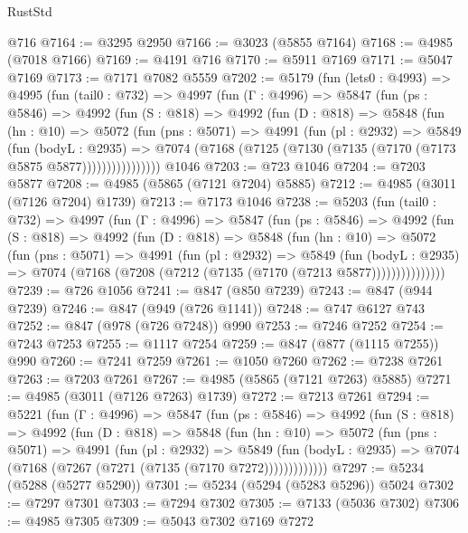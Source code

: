 \begin{lexlean}{RustStd}
\begin{coremodule}
    @716
@7164 := @3295 @2950
@7166 := @3023 (@5855 @7164)
@7168 := @4985 (@7018 @7166)
@7169 := @4191 @716
@7170 := @5911 @7169
@7171 := @5047 @7169
@7173 := @7171 @7082 @5559
@7202 := @5179
    (fun (lets0 : @4993) =>
    @4995
      (fun (tail0 : @732) =>
      @4997
        (fun (Γ : @4996) =>
        @5847
          (fun (ps : @5846) =>
          @4992
            (fun (S : @818) =>
            @4992
              (fun (D : @818) =>
              @5848
                (fun (hn : @10) =>
                @5072
                  (fun (pns : @5071) =>
                  @4991
                    (fun (pl : @2932) =>
                    @5849
                      (fun (bodyL : @2935) =>
                      @7074 (@7168 (@7125 (@7130 (@7135 (@7170 (@7173 @5875 @5877))))))))))))))))
    @1046
@7203 := @723 @1046
@7204 := @7203 @5877
@7208 := @4985 (@5865 (@7121 @7204) @5885)
@7212 := @4985 (@3011 (@7126 @7204) @1739)
@7213 := @7173 @1046
@7238 := @5203
    (fun (tail0 : @732) =>
    @4997
      (fun (Γ : @4996) =>
      @5847
        (fun (ps : @5846) =>
        @4992
          (fun (S : @818) =>
          @4992
            (fun (D : @818) =>
            @5848
              (fun (hn : @10) =>
              @5072
                (fun (pns : @5071) =>
                @4991
                  (fun (pl : @2932) =>
                  @5849
                    (fun (bodyL : @2935) =>
                    @7074 (@7168 (@7208 (@7212 (@7135 (@7170 (@7213 @5877)))))))))))))))
@7239 := @726 @1056
@7241 := @847 (@850 @7239)
@7243 := @847 (@944 @7239)
@7246 := @847 (@949 (@726 @1141))
@7248 := @747 @6127 @743
@7252 := @847 (@978 (@726 @7248)) @990
@7253 := @7246 @7252
@7254 := @7243 @7253
@7255 := @1117 @7254
@7259 := @847 (@877 (@1115 @7255)) @990
@7260 := @7241 @7259
@7261 := @1050 @7260
@7262 := @7238 @7261
@7263 := @7203 @7261
@7267 := @4985 (@5865 (@7121 @7263) @5885)
@7271 := @4985 (@3011 (@7126 @7263) @1739)
@7272 := @7213 @7261
@7294 := @5221
    (fun (Γ : @4996) =>
    @5847
      (fun (ps : @5846) =>
      @4992
        (fun (S : @818) =>
        @4992
          (fun (D : @818) =>
          @5848
            (fun (hn : @10) =>
            @5072
              (fun (pns : @5071) =>
              @4991
                (fun (pl : @2932) =>
                @5849
                  (fun (bodyL : @2935) =>
                  @7074 (@7168 (@7267 (@7271 (@7135 (@7170 @7272)))))))))))))
@7297 := @5234 (@5288 (@5277 @5290))
@7301 := @5234 (@5294 (@5283 @5296)) @5024
@7302 := @7297 @7301
@7303 := @7294 @7302
@7305 := @7133 (@5036 @7302)
@7306 := @4985 @7305
@7309 := @5043 @7302 @7169 @7272

\end{coremodule}
\end{lexlean}
